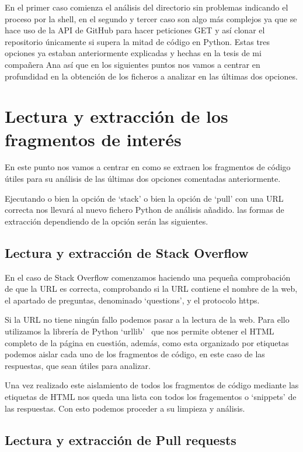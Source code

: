 \documentclass[a4paper, 12pt]{book}
\begin{document}
En el primer caso comienza el análisis del directorio sin problemas indicando el proceso por la shell, en el segundo y tercer caso son algo más complejos ya que se hace uso de la API de GitHub para hacer peticiones GET y así clonar el repositorio únicamente si supera la mitad de código en Python. Estas tres opciones ya estaban anteriormente explicadas y hechas en la tesis de mi compañera Ana así que en los siguientes puntos nos vamos a centrar en profundidad en la obtención de los ficheros a analizar en las últimas dos opciones.

\section{Lectura y extracción de los fragmentos de interés} 
\label{sec:Obtención de ficheros en las diferentes opciones}

En este punto nos vamos a centrar en como se extraen los fragmentos de código útiles para su análisis de las últimas dos opciones comentadas anteriormente.

Ejecutando o bien la opción de `stack' o bien la opción de `pull' con una URL correcta nos llevará al nuevo fichero Python de análisis añadido. las formas de extracción dependiendo de la opción serán las siguientes.

\subsection{Lectura y extracción de Stack Overflow}

En el caso de Stack Overflow comenzamos haciendo una pequeña comprobación de que la URL es correcta, comprobando si la URL contiene el nombre de la web, el apartado de preguntas, denominado `questions', y el protocolo https.

Si la URL no tiene ningún fallo podemos pasar a la lectura de la web. Para ello utilizamos la librería de 
Python `urllib'~\cite{website:Urllib} que nos permite obtener el HTML completo de la página en cuestión, además, como esta organizado por etiquetas podemos aislar cada uno de los fragmentos de código, en este caso de las respuestas, que sean útiles para analizar.

Una vez realizado este aislamiento de todos los fragmentos de código mediante las etiquetas de HTML nos queda una lista con todos los fragementos o `snippets' de las respuestas. Con esto podemos proceder a su limpieza y análisis.

\subsection{Lectura y extracción de Pull requests}
\end{document}
